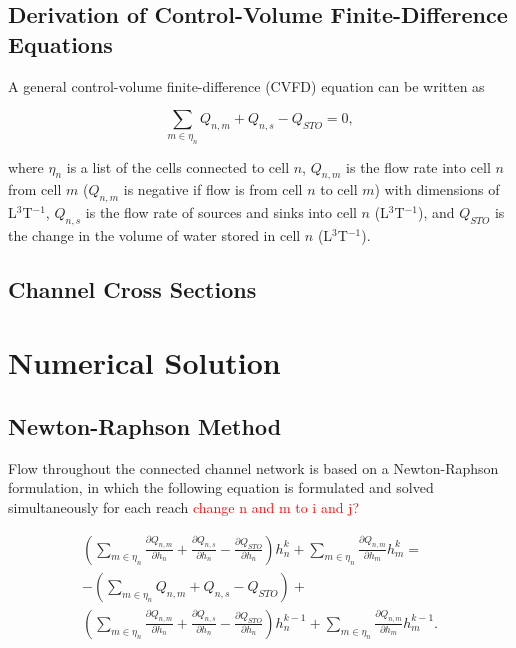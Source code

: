 \documentclass[fleqn]{article}
\begin{document}
\subsection{Derivation of Control-Volume Finite-Difference Equations}

A general control-volume finite-difference (CVFD) equation can be written as

\begin{equation}
  \label{eqn:cvfd}
  \sum \limits_{m \in \eta_{n}} Q_{n,m} + Q_{n,s} - Q_{STO} = 0,
  \end{equation}
  
\noindent where $\eta_{n}$ is a list of the cells connected to cell $n$, $Q_{n,m}$ is the flow rate into cell $n$ from cell $m$ ($Q_{n,m}$ is negative if flow is from cell $n$ to cell $m$) with dimensions of L$^{3}$T$^{-1}$, $Q_{n,s}$ is the flow rate of sources and sinks into cell $n$ (L$^{3}$T$^{-1}$), and $Q_{STO}$ is the change in the volume of water stored in cell $n$ (L$^{3}$T$^{-1}$).

\subsection{Channel Cross Sections}

\section{Numerical Solution}

\subsection{Newton-Raphson Method}

Flow throughout the connected channel network is based on a Newton-Raphson formulation, in which the following equation is formulated and solved simultaneously for each reach \textcolor{red}{change n and m to i and j?}

\begin{equation}
\label{eqn:nr-cvfd}
\begin{split}
\left ( \sum\limits_{m \in \eta_{n}} \frac{\partial Q_{n,m}}{\partial h_n} + \frac{\partial Q_{n,s}}{\partial h_n} - \frac{\partial Q_{STO}}{\partial h_n} \right ) h^k_n + 
\sum\limits_{m \in \eta_{n}} \frac{\partial Q_{n,m}}{\partial h_m} h^k_{m} = \\
- \left ( \sum\limits_{m \in \eta_{n}} Q_{n,m} + Q_{n,s} - Q_{STO} \right ) + \\
\left ( \sum\limits_{m \in \eta_{n}} \frac{\partial Q_{n,m}}{\partial h_n} + \frac{\partial Q_{n,s}}{\partial h_n} - \frac{\partial Q_{STO}}{\partial h_n} \right ) h^{k-1}_n + \sum\limits_{m \in \eta_{n}} \frac{\partial Q_{n,m}}{\partial h_m} h^{k-1}_{m}.
\end{split}
\end{equation}
\end{document}
